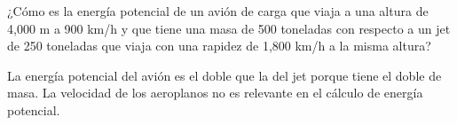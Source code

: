 ¿Cómo es la energía potencial de un avión de carga que viaja a una altura de
4,000 m a 900 km/h y que tiene una masa de 500 toneladas con respecto a un jet
de 250 toneladas que viaja con una rapidez de 1,800 km/h a la misma altura?


\begin{solutionbox}{1.6cm}
    La energía potencial del avión es el doble que la del jet porque tiene el doble de
    masa. La velocidad de los aeroplanos no es relevante en el cálculo de energía
    potencial.
\end{solutionbox}
